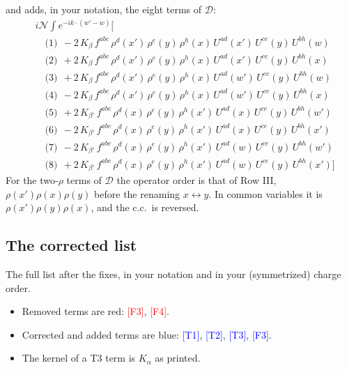 \documentclass[10pt]{article}
\numberwithin{equation}{section}
\newcommand{\NN}{\mathcal N}
\begin{document}
and adds, in your notation, the eight terms of $\mathcal D$:
\begin{align*}
&i\NN\int e^{-ik\cdot(w'-w)}\Big[\\
&\quad\text{(1)}\ \ -2\,K_{\beta}\,f^{abc}\,\rho^{d}(x')\,\rho^{e}(y)\,\rho^{h}(x)\,U^{ad}(x')\,U^{ce}(y)\,U^{bh}(w)\\
&\quad\text{(2)}\ \ +2\,K_{\beta}\,f^{abc}\,\rho^{d}(x')\,\rho^{e}(y)\,\rho^{h}(x)\,U^{ad}(x')\,U^{ce}(y)\,U^{bh}(x)\\
&\quad\text{(3)}\ \ +2\,K_{\beta}\,f^{abc}\,\rho^{d}(x')\,\rho^{e}(y)\,\rho^{h}(x)\,U^{ad}(w')\,U^{ce}(y)\,U^{bh}(w)\\
&\quad\text{(4)}\ \ -2\,K_{\beta}\,f^{abc}\,\rho^{d}(x')\,\rho^{e}(y)\,\rho^{h}(x)\,U^{ad}(w')\,U^{ce}(y)\,U^{bh}(x)\\
&\quad\text{(5)}\ \ +2\,K_{\beta'}\,f^{abc}\,\rho^{d}(x)\,\rho^{e}(y)\,\rho^{h}(x')\,U^{ad}(x)\,U^{ce}(y)\,U^{bh}(w')\\
&\quad\text{(6)}\ \ -2\,K_{\beta'}\,f^{abc}\,\rho^{d}(x)\,\rho^{e}(y)\,\rho^{h}(x')\,U^{ad}(x)\,U^{ce}(y)\,U^{bh}(x')\\
&\quad\text{(7)}\ \ -2\,K_{\beta'}\,f^{abc}\,\rho^{d}(x)\,\rho^{e}(y)\,\rho^{h}(x')\,U^{ad}(w)\,U^{ce}(y)\,U^{bh}(w')\\
&\quad\text{(8)}\ \ +2\,K_{\beta'}\,f^{abc}\,\rho^{d}(x)\,\rho^{e}(y)\,\rho^{h}(x')\,U^{ad}(w)\,U^{ce}(y)\,U^{bh}(x')\Big]
\end{align*}
For the two-$\rho$ terms of $\mathcal D$ the operator order is that of Row III, $\rho(x')\rho(x)\rho(y)$ before the renaming $x\leftrightarrow y$. In common variables it is $\rho(x')\rho(y)\rho(x)$, and the c.c.\ is reversed.

\subsection{The corrected list}\label{sec:corrected}
The full list after the fixes, in your notation and in your (symmetrized) charge order.
\begin{itemize}
\item Removed terms are red: \textcolor{red}{[F3]}, \textcolor{red}{[F4]}.
\item Corrected and added terms are blue: \textcolor{blue}{[T1]}, \textcolor{blue}{[T2]}, \textcolor{blue}{[T3]}, \textcolor{blue}{[F3]}.
\item The kernel of a T3 term is $K_\alpha$ as printed.
\end{itemize}
\end{document}
